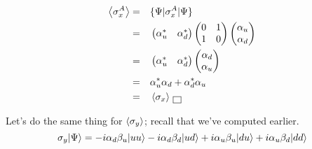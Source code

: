 \documentclass[solutions.tex]{subfiles}
\begin{document}
\begin{equation*}\begin{aligned}
	\left\langle \sigma_x^A \right\rangle &=&& \{\Psi|\sigma_x^A|\Psi\} \\
	~ &=&& \begin{pmatrix} \alpha_u^* & \alpha_d^* \\ \end{pmatrix}
		\begin{pmatrix}
			0 & 1 \\
			1 & 0 \\
		\end{pmatrix}\begin{pmatrix}
			\alpha_u \\
			\alpha_d \\
		\end{pmatrix} \\
	~ &=&& \begin{pmatrix} \alpha_u^* & \alpha_d^* \\ \end{pmatrix}
		\begin{pmatrix}
			\alpha_d \\
			\alpha_u \\
		\end{pmatrix} \\
	~ &=&& \alpha_u^*\alpha_d + \alpha_d^*\alpha_u \\
	~ &=&& \left\langle \sigma_x \right\rangle \,\boxed{\,}
\end{aligned}\end{equation*}

\hrr

Let's do the same thing for $\left\langle \sigma_y \right\rangle$; recall that
we've computed earlier.
\[
	\sigma_y|\Psi\rangle = -i\alpha_d\beta_u|uu\rangle -i\alpha_d\beta_d|ud\rangle
		+ i\alpha_u\beta_u|du\rangle+ i\alpha_u\beta_d|dd\rangle
\]
\end{document}
